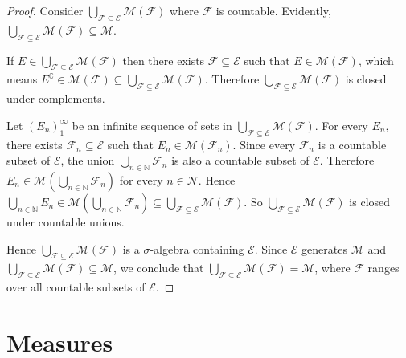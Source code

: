 \begin{proof}
    Consider \( \bigcup_{\mathcal{F} \subseteq \mathcal{E}} \mathcal{M}(\mathcal{F}) \) where \( \mathcal{F} \) is countable. Evidently, \( \bigcup_{\mathcal{F} \subseteq \mathcal{E}} \mathcal{M}(\mathcal{F}) \subseteq \mathcal{M} \).

    If \( E \in \bigcup_{\mathcal{F} \subseteq \mathcal{E}} \mathcal{M}(\mathcal{F}) \) then there exists \( \mathcal{F} \subseteq \mathcal{E} \) such that \( E \in \mathcal{M}(\mathcal{F}) \), which means \( E^{\complement} \in \mathcal{M}(\mathcal{F}) \subseteq \bigcup_{\mathcal{F} \subseteq \mathcal{E}} \mathcal{M}(\mathcal{F}) \). Therefore \( \bigcup_{\mathcal{F} \subseteq \mathcal{E}} \mathcal{M}(\mathcal{F}) \) is closed under complements.

    Let \( {(E_{n})}_{1}^{\infty} \) be an infinite sequence of sets in \( \bigcup_{\mathcal{F} \subseteq \mathcal{E}} \mathcal{M}(\mathcal{F}) \). For every \( E_{n} \), there exists \( \mathcal{F}_{n} \subseteq \mathcal{E} \) such that \( E_{n} \in \mathcal{M}(\mathcal{F}_{n}) \). Since every \( \mathcal{F}_{n} \) is a countable subset of \( \mathcal{E} \), the union \( \bigcup_{n \in \mathbb{N}} \mathcal{F}_{n} \) is also a countable subset of \( \mathcal{E} \). Therefore \( E_{n} \in \mathcal{M}\left( \bigcup_{n \in \mathbb{N}} \mathcal{F}_{n} \right) \) for every \( n \in \mathcal{N} \). Hence \( \bigcup_{n \in \mathbb{N}} E_{n} \in \mathcal{M}\left( \bigcup_{n \in \mathbb{N}} \mathcal{F}_{n} \right) \subseteq \bigcup_{\mathcal{F} \subseteq \mathcal{E}} \mathcal{M}(\mathcal{F}) \). So \( \bigcup_{\mathcal{F} \subseteq \mathcal{E}} \mathcal{M}(\mathcal{F}) \) is closed under countable unions.

    Hence \( \bigcup_{\mathcal{F} \subseteq \mathcal{E}} \mathcal{M}(\mathcal{F}) \) is a \( \sigma \)-algebra containing \( \mathcal{E} \). Since \( \mathcal{E} \) generates \( \mathcal{M} \) and \( \bigcup_{\mathcal{F} \subseteq \mathcal{E}} \mathcal{M}(\mathcal{F}) \subseteq \mathcal{M} \), we conclude that \( \bigcup_{\mathcal{F} \subseteq \mathcal{E}} \mathcal{M}(\mathcal{F}) = \mathcal{M} \), where \( \mathcal{F} \) ranges over all countable subsets of \( \mathcal{E} \).
\end{proof}

\newpage

\section{Measures}


